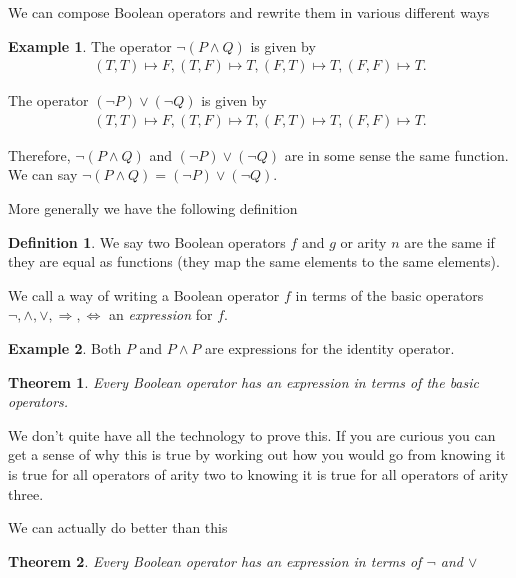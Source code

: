 \documentclass[
]{book}
\newtheorem{theorem}{Theorem}[chapter]
\theoremstyle{definition}
\newtheorem{definition}{Definition}[chapter]
\theoremstyle{definition}
\newtheorem{example}{Example}[chapter]
\theoremstyle{definition}
\theoremstyle{definition}
\theoremstyle{remark}
\begin{document}
We can compose Boolean operators and rewrite them in various different ways

\begin{example}
The operator \(\neg (P \wedge Q)\) is given by
\begin{align*}
(T,T) \mapsto F,
(T,F) \mapsto T,
(F,T) \mapsto T,
(F,F) \mapsto T.
\end{align*}

The operator \((\neg P) \vee (\neg Q)\) is given by
\begin{align*}
(T,T) \mapsto F,
(T,F) \mapsto T,
(F,T) \mapsto T,
(F,F) \mapsto T.
\end{align*}

Therefore, \(\neg(P \wedge Q)\) and \((\neg P) \vee (\neg Q)\) are in some sense the same function. We can say \(\neg(P \wedge Q)=(\neg P) \vee (\neg Q)\).
\end{example}

More generally we have the following definition

\begin{definition}
We say two Boolean operators \(f\) and \(g\) or arity \(n\) are the same if they are equal as functions (they map the same elements to the same elements).

We call a way of writing a Boolean operator \(f\) in terms of the basic operators \(\neg, \wedge, \vee, \Rightarrow, \Leftrightarrow\) an \emph{expression} for \(f\).
\end{definition}

\begin{example}
Both \(P\) and \(P \wedge P\) are expressions for the identity operator.
\end{example}

\begin{theorem}
Every Boolean operator has an expression in terms of the basic operators.
\end{theorem}

We don't quite have all the technology to prove this. If you are curious you can get a sense of why this is true by working out how you would go from knowing it is true for all operators of arity two to knowing it is true for all operators of arity three.

We can actually do better than this

\begin{theorem}
Every Boolean operator has an expression in terms of \(\neg\) and \(\vee\)
\end{theorem}
\end{document}
